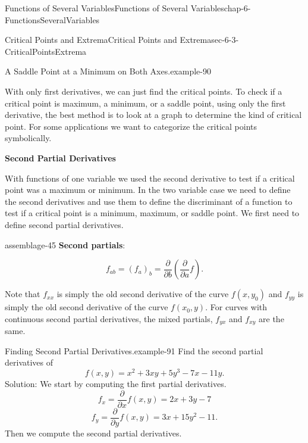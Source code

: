 \documentclass[oneside,10pt,]{book}
\newcommand{\terminology}[1]{\textbf{#1}}
\numberwithin{equation}{section}
\begin{document}
\begin{chapterptx}{Functions of Several Variables}{}{Functions of Several Variables}{}{}{chap-6-FunctionsSeveralVariables}
\begin{sectionptx}{Critical Points and Extrema}{}{Critical Points and Extrema}{}{}{sec-6-3-CriticalPointsExtrema}
\begin{example}{A Saddle Point at a Minimum on Both Axes.}{example-90}
\begin{sidebyside}{1}{0}{0}{0}
\begin{sbspanel}{1}
\end{sbspanel}%
\end{sidebyside}%
\end{example}
\hypertarget{p-2349}{}%
With only first derivatives, we can just find the critical points.  To check if a critical point is maximum, a minimum, or a saddle point, using only the first derivative, the best method is to look at a graph to determine the kind of critical point.  For some applications we want to categorize the critical points symbolically.%
\par
\hypertarget{p-2350}{}%
\terminology{Second Partial Derivatives}%
\par
\hypertarget{p-2351}{}%
With functions of one variable we used the second derivative to test if a critical point was a maximum or minimum.  In the two variable case we need to define the second derivatives and use them to define the discriminant of a function to test if a critical point is a minimum, maximum, or saddle point.  We first need to define second partial derivatives.%
\begin{assemblage}{}{assemblage-45}%
\hypertarget{p-2352}{}%
\terminology{Second partials}:%
\par
\hypertarget{p-2353}{}%
%
\begin{equation*}
f_{ab}=(f_a )_b=\frac{\partial}{\partial b}(\frac{\partial}{\partial a} f).
\end{equation*}
%
\end{assemblage}
\hypertarget{p-2354}{}%
Note that \(f_{xx}\) is simply the old second derivative of the curve \(f(x,y_0)\) and \(f_{yy}\) is simply the old second derivative of the curve \(f(x_0,y)\).  For curves with continuous second partial derivatives, the mixed partials, \(f_{yx}\) and \(f_{xy}\) are the same.%
\begin{example}{Finding Second Partial Derivatives.}{example-91}%
\hypertarget{p-2355}{}%
Find the second partial derivatives of%
%
\begin{equation*}
f(x,y)=x^2+ 3xy+5y^3-7x-11y. 
\end{equation*}
\hypertarget{p-2356}{}%
Solution:  We start by computing the first partial derivatives.%
%
\begin{equation*}
f_x=\frac{\partial}{\partial x} f(x,y)=2x+3y-7
\end{equation*}
%
\begin{equation*}
f_y=\frac{\partial}{\partial y} f(x,y)=3x+15y^2-11.
\end{equation*}
\hypertarget{p-2357}{}%
Then we compute the second partial derivatives.%

\end{example}
\end{sectionptx}
\end{chapterptx}
\end{document}
